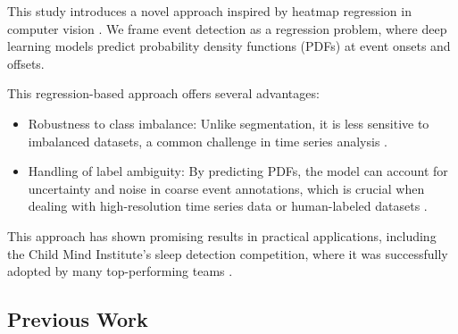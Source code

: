 \documentclass{article}
\begin{document}
This study introduces a novel approach inspired by heatmap regression in computer vision \citep{luo2021, yu2022}. We frame event detection as a regression problem, where deep learning models predict probability density functions (PDFs) at event onsets and offsets.

This regression-based approach offers several advantages:

\begin{itemize}
  \item Robustness to class imbalance: Unlike segmentation, it is less sensitive to imbalanced datasets, a common challenge in time series analysis \citep{aminikhanghahi2017, azib2023}.
  \item Handling of label ambiguity: By predicting PDFs, the model can account for uncertainty and noise in coarse event annotations, which is crucial when dealing with high-resolution time series data or human-labeled datasets \citep{luo2021,yu2022}.
\end{itemize}

This approach has shown promising results in practical applications, including the Child Mind Institute's sleep detection competition, where it was successfully adopted by many top-performing teams \citep{esper2023}.

\subsection{Previous Work}


\end{document}
